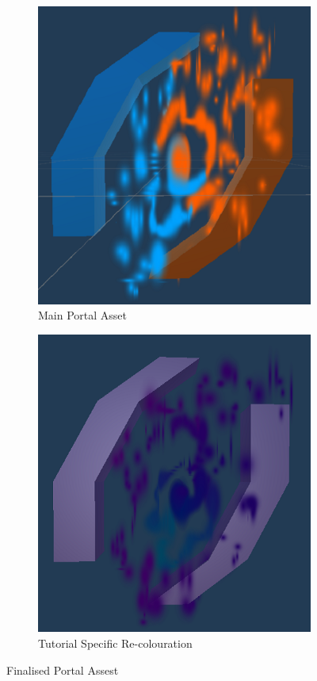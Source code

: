 \begin{figure}[H]
\centering
\begin{subfigure}{0.5\textwidth}
  \centering
  \includegraphics[width=1\linewidth]{Figures/finporta.png}
  \caption{Main Portal Asset}
\end{subfigure}%
\begin{subfigure}{0.5\textwidth}
  \centering
  \includegraphics[width=1\linewidth]{Figures/finportb.png}
  \caption{Tutorial Specific Re-colouration}
\end{subfigure}
\caption{Finalised Portal Assest}
\end{figure}

